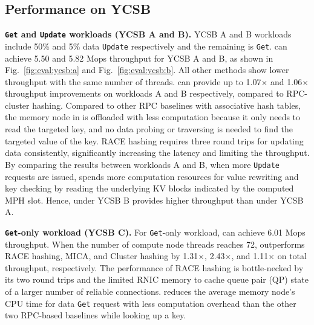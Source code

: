\subsection{Performance on YCSB}
\label{sec:eval:ycsb}





\textbf{\texttt{Get} and \texttt{Update} workloads (YCSB A and B).}
YCSB A and B workloads include 50\% and 5\% data \texttt{Update} respectively and the remaining is \texttt{Get}. 
\sys can achieve 5.50 and 5.82 Mops throughput for YCSB A and B, as shown in Fig.~\ref{fig:eval:ycsb:a} and Fig.~\ref{fig:eval:ycsb:b}. 
All other methods show lower throughput with the same number of threads. 
\sys can provide up to 1.07$\times$ and 1.06$\times$ throughput improvements on workloads A and B respectively, compared to RPC-cluster hashing. 
Compared to other RPC baselines with associative hash tables, the memory node in \sys is offloaded with less computation because it only needs to read the targeted key, and no data probing or traversing is needed to find the targeted value of the key. 
RACE hashing requires three round trips for updating data consistently, significantly increasing the latency and limiting the throughput.
By comparing the results between workloads A and B, 
when more \texttt{Update} requests are issued, \sys spends more computation resources for value rewriting and key checking by reading the underlying KV blocks indicated by the computed MPH slot. 
Hence, \sys under YCSB B provides higher throughput than \sys under YCSB A.


\textbf{\texttt{Get}-only workload (YCSB C).}
For \texttt{Get}-only workload, \sys can achieve 6.01 Mops throughput.
When the number of compute node threads reaches 72, \sys outperforms RACE hashing, MICA, and Cluster hashing by 1.31$\times$, 2.43$\times$, and 1.11$\times$ on total throughput, respectively. The performance of RACE hashing is bottle-necked by its two round trips and the limited RNIC memory to cache queue pair (QP) state of a larger number of reliable connections.
\sys reduces the average memory node's CPU time for data \texttt{Get} request with less computation overhead than the other two RPC-based baselines while looking up a key. 


